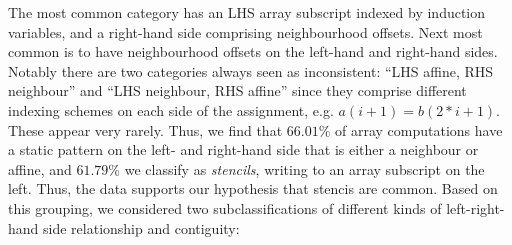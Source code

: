 \begin{center}
\begin{tabular}{ll|S[table-format=4]S[table-format=2.2]S[table-format=4]S[table-format=2.2]c}
\end{tabular}
\end{center}
%
The most common category has an LHS array subscript
indexed by induction variables, and a right-hand side comprising
neighbourhood offsets. Next most common is to have neighbourhood
offsets on the left-hand and right-hand sides. Notably
there are two categories always seen as inconsistent:
``LHS affine, RHS neighbour'' and ``LHS neighbour, RHS affine''
since they comprise different indexing schemes
on each side of the assignment, e.g. $a(i + 1) = b(2*i + 1)$. These
appear very rarely. Thus, we find that $66.01\%$ of array computations
have a static pattern on the left- and right-hand side that is either
a neighbour or affine, and $61.79\%$ we classify as \emph{stencils},
writing to an array subscript on the left. Thus, the data supports our
hypothesis that stencis are common. Based on this grouping, we
considered two subclassifications of different kinds of
left-right-hand side relationship and contiguity:
